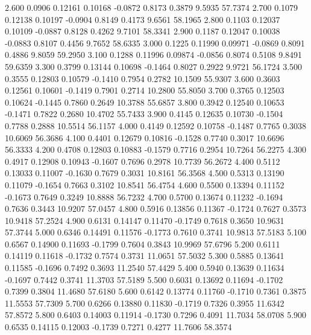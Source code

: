    2.600   0.0906   0.12161   0.10168  -0.0872   0.8173   0.3879   9.5935  57.7374
   2.700   0.1079   0.12138   0.10197  -0.0904   0.8149   0.4173   9.6561  58.1965
   2.800   0.1103   0.12037   0.10109  -0.0887   0.8128   0.4262   9.7101  58.3341
   2.900   0.1187   0.12047   0.10038  -0.0883   0.8107   0.4456   9.7652  58.6335
   3.000   0.1225   0.11990   0.09971  -0.0869   0.8091   0.4886   9.8059  59.2950
   3.100   0.1288   0.11996   0.09874  -0.0856   0.8074   0.5108   9.8491  59.6359
   3.300   0.3799   0.13144   0.10698  -0.1464   0.8027   0.2922   9.9721  56.1724
   3.500   0.3555   0.12803   0.10579  -0.1410   0.7954   0.2782  10.1509  55.9307
   3.600   0.3603   0.12561   0.10601  -0.1419   0.7901   0.2714  10.2800  55.8050
   3.700   0.3765   0.12503   0.10624  -0.1445   0.7860   0.2649  10.3788  55.6857
   3.800   0.3942   0.12540   0.10653  -0.1471   0.7822   0.2680  10.4702  55.7433
   3.900   0.4145   0.12635   0.10730  -0.1504   0.7788   0.2888  10.5514  56.1157
   4.000   0.4149   0.12592   0.10758  -0.1487   0.7765   0.3038  10.6069  56.3686
   4.100   0.4401   0.12679   0.10816  -0.1528   0.7740   0.3017  10.6696  56.3333
   4.200   0.4708   0.12803   0.10883  -0.1579   0.7716   0.2954  10.7264  56.2275
   4.300   0.4917   0.12908   0.10943  -0.1607   0.7696   0.2978  10.7739  56.2672
   4.400   0.5112   0.13033   0.11007  -0.1630   0.7679   0.3031  10.8161  56.3568
   4.500   0.5313   0.13190   0.11079  -0.1654   0.7663   0.3102  10.8541  56.4754
   4.600   0.5500   0.13394   0.11152  -0.1673   0.7649   0.3249  10.8888  56.7232
   4.700   0.5700   0.13674   0.11232  -0.1694   0.7636   0.3443  10.9207  57.0457
   4.800   0.5916   0.13856   0.11367  -0.1724   0.7627   0.3573  10.9418  57.2524
   4.900   0.6131   0.14147   0.11470  -0.1749   0.7618   0.3650  10.9631  57.3744
   5.000   0.6346   0.14491   0.11576  -0.1773   0.7610   0.3741  10.9813  57.5183
   5.100   0.6567   0.14900   0.11693  -0.1799   0.7604   0.3843  10.9969  57.6796
   5.200   0.6111   0.14119   0.11618  -0.1732   0.7574   0.3731  11.0651  57.5032
   5.300   0.5885   0.13641   0.11585  -0.1696   0.7492   0.3693  11.2540  57.4429
   5.400   0.5940   0.13639   0.11634  -0.1697   0.7442   0.3741  11.3703  57.5189
   5.500   0.6031   0.13692   0.11694  -0.1702   0.7399   0.3804  11.4680  57.6180
   5.600   0.6142   0.13774   0.11760  -0.1710   0.7361   0.3875  11.5553  57.7309
   5.700   0.6266   0.13880   0.11830  -0.1719   0.7326   0.3955  11.6342  57.8572
   5.800   0.6403   0.14003   0.11914  -0.1730   0.7296   0.4091  11.7034  58.0708
   5.900   0.6535   0.14115   0.12003  -0.1739   0.7271   0.4277  11.7606  58.3574
